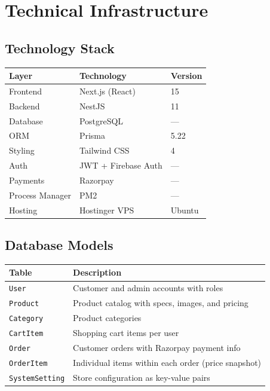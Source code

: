 \documentclass[12pt,a4paper]{article}
\begin{document}
\section{Technical Infrastructure}

\subsection{Technology Stack}

\begin{tabular}{@{}L{3cm} L{4.5cm} L{5cm}@{}}
\toprule
\textbf{Layer} & \textbf{Technology} & \textbf{Version} \\
\midrule
Frontend & Next.js (React) & 15 \\
Backend & NestJS & 11 \\
Database & PostgreSQL & — \\
ORM & Prisma & 5.22 \\
Styling & Tailwind CSS & 4 \\
Auth & JWT + Firebase Auth & — \\
Payments & Razorpay & — \\
Process Manager & PM2 & — \\
Hosting & Hostinger VPS & Ubuntu \\
\bottomrule
\end{tabular}

\subsection{Database Models}

\begin{tabular}{@{}L{3.5cm} L{9.5cm}@{}}
\toprule
\textbf{Table} & \textbf{Description} \\
\midrule
\texttt{User} & Customer and admin accounts with roles \\
\texttt{Product} & Product catalog with specs, images, and pricing \\
\texttt{Category} & Product categories \\
\texttt{CartItem} & Shopping cart items per user \\
\texttt{Order} & Customer orders with Razorpay payment info \\
\texttt{OrderItem} & Individual items within each order (price snapshot) \\
\texttt{SystemSetting} & Store configuration as key-value pairs \\
\bottomrule
\end{tabular}
\end{document}
